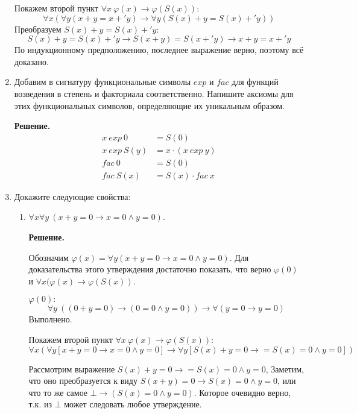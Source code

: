 \begin{enumerate}
Покажем второй пункт  $\forall x \ \varphi(x) \to \varphi(S(x))$:
\begin{equation*}
	\forall x (\forall y (x + y = x +' y) \to \forall y (S(x) + y = S(x) +' y))
\end{equation*}
Преобразуем $S(x) + y = S(x) +' y$:
\begin{equation*}
	S(x) + y = S(x) +' y \to S(x + y) = S(x +' y) \to x + y = x +' y
\end{equation*}
По индукционному предположению, последнее выражение верно, поэтому всё доказано.

\item Добавим в сигнатуру функциональные символы $exp$ и $fac$ для функций возведения в степень и факториала
соответственно.
    Напишите аксиомы для этих функциональных символов, определяющие их уникальным образом.

	\textbf{Решение.}
	\begin{align*}
		x \ exp \ 0 &= S(0)\\
		x \ exp \ S(y) &= x \cdot (x \ exp\ y) \\ 
		fac \ 0 &= S(0) \\
		fac \ S(x) &= S(x) \cdot fac\ x
	\end{align*}

\item Докажите следующие свойства:
\begin{enumerate}
\item $\forall x \forall y\ (x + y = 0 \to x = 0 \land y = 0)$.

\textbf{Решение.} 

Обозначим $\varphi(x) = \forall y (x + y = 0 \to x = 0 \land y = 0)$. Для доказательства этого утверждения 
достаточно показать, что верно $\varphi(0)$ и $\forall x (\varphi(x) \to \varphi(S(x))$.

$\varphi(0):$ 
\begin{equation*}
\forall y \ ((0 + y = 0) \to (0 = 0 \land y = 0)) \to \forall (y = 0 \to y = 0)
\end{equation*}
Выполнено.

Покажем второй пункт  $\forall x \ \varphi(x) \to \varphi(S(x))$:
\begin{equation*}
\forall x (\forall y [x + y = 0 \to x = 0 \land y = 0] \to \forall y [S(x) + y = 0 \to  = S(x) = 0 \land y = 0])
\end{equation*}

Рассмотрим выражение $S(x) + y = 0 \to  = S(x) = 0 \land y = 0$, Заметим, что оно преобразуется к виду $S(x + 
y) = 0 \to S(x) = 0 \land y = 0$, или что то же самое $\bot \to (S(x) = 0 \land y = 0)$. Которое очевидно 
верно, т.к. из $\bot$ может следовать любое утверждение. 


\end{enumerate}
\end{enumerate}
